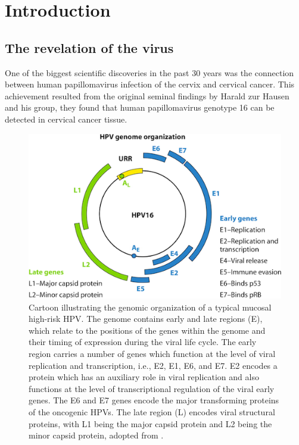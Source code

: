 
\chapter{Introduction}\label{intro}

\section{The revelation of the virus}
One of the biggest scientific discoveries in the past 30 years was the connection between human papillomavirus infection of the cervix and cervical cancer. This achievement resulted from the original seminal findings by Harald zur Hausen and his group, they found that human papillomavirus genotype 16 can be detected in cervical cancer tissue. 
\begin{figure}[ht]
	\centering
	\includegraphics[scale=0.7]{IMG/genoma.png}
	\caption{Cartoon illustrating the genomic organization of a typical mucosal high-risk HPV. The genome contains early and late regions (E), which relate to the positions of the genes within the genome and their timing of expression during the viral life cycle. The early region carries a number of genes which function at the level of viral replication and transcription, i.e., E2, E1, E6, and E7. E2 encodes a protein which has an auxiliary role in viral replication and also functions at the level of transcriptional regulation of the viral early genes. The E6 and E7 genes encode the major transforming proteins of the oncogenic HPVs. The late region (L) encodes viral structural proteins, with L1 being the major capsid protein and L2 being the minor capsid protein, adopted from 
	\cite{Stanley215}.}
	\label{genoma}
\end{figure}

